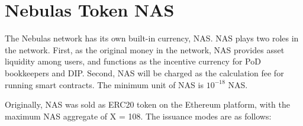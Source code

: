 \section{Nebulas Token NAS}
\label{sec:nascoin}

The Nebulas network has its own built-in currency, NAS. NAS plays two roles in the network. First, as the original money in the network, NAS provides asset liquidity among users, and functions as the incentive currency for PoD bookkeepers and DIP. Second, NAS will be charged as the calculation fee for running smart contracts. The minimum unit of NAS is $10^{-18}$ NAS.


Originally, NAS was sold as ERC20 token on the Ethereum platform, with the maximum NAS aggregate of X = 108. The issuance modes are as follows:

